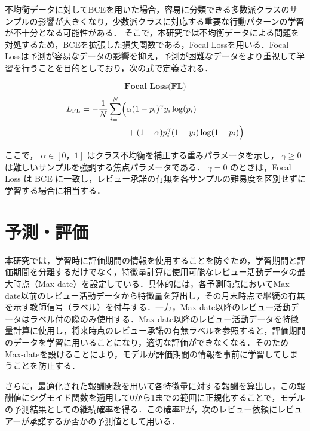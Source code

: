 \documentclass[11pt]{jreport}
\begin{document}
不均衡データに対してBCEを用いた場合，容易に分類できる多数派クラスのサンプルの影響が大きくなり，少数派クラスに対応する重要な行動パターンの学習が不十分となる可能性がある．
そこで，本研究では不均衡データによる問題を対処するため，BCEを拡張した損失関数である，Focal Lossを用いる．Focal Lossは予測が容易なデータの影響を抑え，予測が困難なデータをより重視して学習を行うことを目的としており，次の式で定義される．\cite{BCE-FocalLoss}


\[\textbf{Focal Loss(FL)}\]
\begin{align}
L_{\mathrm{FL}} = - \frac{1}{N} \sum_{i=1}^{N} \Bigl( & \alpha (1 - p_i)^{\gamma} y_i \log(p_i) \nonumber \\
& + (1 - \alpha) p_i^{\gamma} (1 - y_i) \log(1 - p_i) \Bigr) \nonumber 
\end{align}


ここで，
\(\alpha \in [0，1]\) はクラス不均衡を補正する重みパラメータを示し，
\(\gamma \ge 0\) は難しいサンプルを強調する焦点パラメータである．  
\(\gamma = 0\) のときは，Focal Loss は BCE に一致し，レビュー承諾の有無を各サンプルの難易度を区別せずに学習する場合に相当する．

\section{予測・評価}
本研究では，学習時に評価期間の情報を使用することを防ぐため，学習期間と評価期間を分離するだけでなく，特徴量計算に使用可能なレビュー活動データの最大時点（Max-date）を設定している．具体的には，各予測時点においてMax-date以前のレビュー活動データから特徴量を算出し，その月末時点で継続の有無を示す教師信号（ラベル）を付与する．一方，Max-date以降のレビュー活動データはラベル付の際のみ使用する．Max-date以降のレビュー活動データを特徴量計算に使用し，将来時点のレビュー承諾の有無ラベルを参照すると，評価期間のデータを学習に用いることになり，適切な評価ができなくなる．そのためMax-dateを設けることにより，モデルが評価期間の情報を事前に学習してしまうことを防止する．

さらに，最適化された報酬関数を用いて各特徴量に対する報酬を算出し，この報酬値にシグモイド関数を適用して0から1までの範囲に正規化することで，モデルの予測結果としての継続確率を得る．この確率Pが，次のレビュー依頼にレビュアーが承諾するか否かの予測値として用いる．
\end{document}

